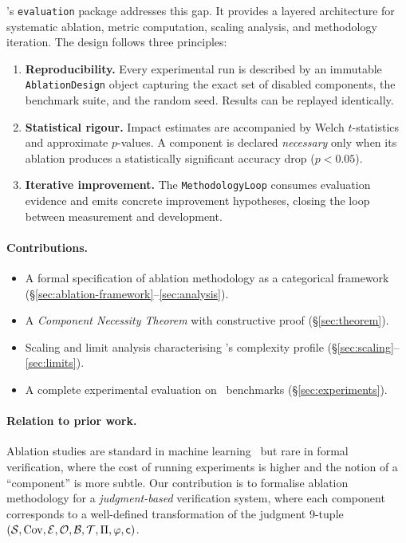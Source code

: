 \documentclass[11pt]{article}
\begin{document}
\JuGeo's \texttt{evaluation} package addresses this gap.  It provides
a layered architecture for systematic ablation, metric computation,
scaling analysis, and methodology iteration.  The design follows three
principles:

\begin{enumerate}[label=\textbf{P\arabic*}.]
\item \textbf{Reproducibility.}  Every experimental run is described
  by an immutable \texttt{AblationDesign} object capturing the exact
  set of disabled components, the benchmark suite, and the random seed.
  Results can be replayed identically.

\item \textbf{Statistical rigour.}  Impact estimates are accompanied by
  Welch $t$-statistics and approximate $p$-values.  A component is
  declared \emph{necessary} only when its ablation produces a
  statistically significant accuracy drop ($p < 0.05$).

\item \textbf{Iterative improvement.}  The \texttt{MethodologyLoop}
  consumes evaluation evidence and emits concrete improvement
  hypotheses, closing the loop between measurement and development.
\end{enumerate}

\paragraph{Contributions.}
\begin{itemize}
\item A formal specification of ablation methodology as a categorical
  framework (§\ref{sec:ablation-framework}--\ref{sec:analysis}).
\item A \emph{Component Necessity Theorem} with constructive proof
  (§\ref{sec:theorem}).
\item Scaling and limit analysis characterising \JuGeo's
  complexity profile (§\ref{sec:scaling}--\ref{sec:limits}).
\item A complete experimental evaluation on \numcases\ benchmarks
  (§\ref{sec:experiments}).
\end{itemize}

\paragraph{Relation to prior work.}
Ablation studies are standard in machine learning~\cite{ablation-ml}
but rare in formal verification, where the cost of running experiments
is higher and the notion of a ``component'' is more subtle.  Our
contribution is to formalise ablation methodology for a
\emph{judgment-based} verification system, where each component
corresponds to a well-defined transformation of the judgment 9-tuple
$(\mathcal{S}, \mathrm{Cov}, \mathcal{E}, \mathcal{O}, \mathcal{B}, \mathcal{T}, \Pi, \varphi, \mathsf{c})$.
\end{document}
